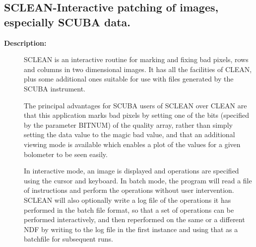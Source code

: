 \subsection{SCLEAN-\label{SCLEAN}Interactive patching of images, especially SCUBA data.}
\begin{description}

\item [{\bf Description:}]
 SCLEAN is an interactive routine for marking and fixing bad pixels,
 rows and columns in two dimensional images.  It has all the
 facilities of CLEAN, plus some additional ones suitable for use
 with files generated by the SCUBA instrument.

 The principal advantages for SCUBA users of SCLEAN over CLEAN are
 that this application marks bad pixels by setting one of the bits
 (specified by the parameter BITNUM) of the quality array, rather
 than simply setting the data value to the magic bad value, and that
 an additional viewing mode is available which enables a plot of the
 values for a given bolometer to be seen easily.

 In interactive mode, an image is displayed and operations are
 specified using the cursor and keyboard.  In batch mode, the program
 will read a file of instructions and perform the operations without
 user intervention.  SCLEAN will also optionally write a log file of
 the operations it has performed in the batch file format, so that
 a set of operations can be performed interactively, and then
 reperformed on the same or a different NDF by writing to the log
 file in the first instance and using that as a batchfile for
 subsequent runs.


\end{description}

